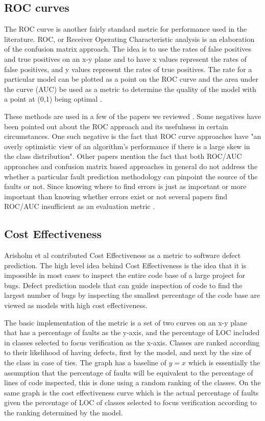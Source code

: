 \documentclass{sig-alternate-05-2015}
\begin{document}
\subsection{ROC curves}

The ROC curve is another fairly standard metric for performance used in the literature.  ROC, or Receiver Operating Characteristic analysis is an elaboration of the confusion matrix approach.  The idea is to use the rates of false positives and true positives on an x-y plane and to have x values represent the rates of false positives, and y values represent the rates of true positives.  The rate for a particular model can be plotted as a point on the ROC curve and the area under the curve (AUC) be used as a metric to determine the quality of the model with a point at (0,1) being optimal \cite{Posnett}.  

These methods are used in a few of the papers we reviewed \cite{Rahman} \cite{Arisholm} \cite{Posnett}.  Some negatives have been pointed out about the ROC approach and its usefulness in certain circumstances.  One such negative is the fact that ROC curve approaches have "an overly optimistic view of an algorithm's performance if there is a large skew in the class distribution".  \cite{Davis}  Other papers mention the fact that both ROC/AUC approaches and confusion matrix based approaches in general do not address the whether a particular fault prediction methodology can pinpoint the source of the faults or not.  Since knowing where to find errors is just as important or more important than knowing whether errors exist or not several papers find ROC/AUC insufficient as an evaluation metric \cite{Posnett} \cite{Arisholm} \cite{Rahman}. 

\subsection{Cost Effectiveness}

Arisholm et al \cite{Arisholm} contributed Cost Effectiveness as a metric to software defect prediction.  The high level idea behind Cost Effectiveness is the idea that it is impossible in most cases to inspect the entire code base of a large project for bugs. Defect prediction models that can guide inspection of code to find the largest number of bugs by inspecting the smallest percentage of the code base are viewed as models with high cost effectiveness.

The basic implementation of the metric is a set of two curves on an x-y plane that has a percentage of faults as the y-axis, and the percentage of LOC included in classes selected to focus verification as the x-axis.  Classes are ranked according to their likelihood of having defects, first by the model, and next by the size of the class in case of ties.  The graph has a baseline of $y=x$ which is essentially the assumption that the percentage of faults will be equivalent to the percentage of lines of code inspected, this is done using a random ranking of the classes.  On the same graph is the cost effectiveness curve which is the actual percentage of faults given the percentage of LOC of classes selected to focus verification according to the ranking determined by the model. 
\end{document}
